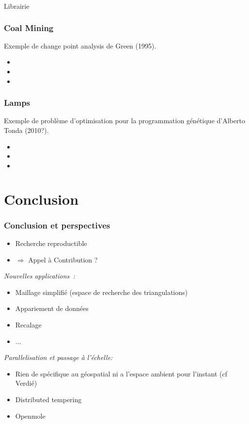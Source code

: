 \documentclass{beamer}
\begin{document}
\begin{frame}{Librairie}
\end{frame}


\begin{frame}
\frametitle{Coal Mining}
Exemple de change point analysis de Green (1995).
\begin{itemize}
\item 
\item 
\item 
\end{itemize}
\end{frame}

\begin{frame}
\frametitle{Lamps}
Exemple de problème d'optimisation pour la programmation génétique d'Alberto Tonda (2010?).
\begin{itemize}
\item 
\item 
\item 
\end{itemize}
\end{frame}

\section{Conclusion}
\begin{frame}
\frametitle{Conclusion et perspectives}
\begin{itemize}
\item Recherche reproductible
\item $\Rightarrow$ Appel à Contribution ?
\end{itemize}
\emph{Nouvelles applications~:} 
\begin{itemize}
\item Maillage simplifié (espace de recherche des triangulations)
\item Appariement de données
\item Recalage
\item ...
\end{itemize}

\emph{Parallelisation et passage à l'échelle:} 
\begin{itemize}
\item Rien de spécifique au géospatial ni a l'espace ambient pour l'instant (cf Verdié)
\item Distributed tempering
\item Openmole
\end{itemize}

\end{frame}
\end{document}

